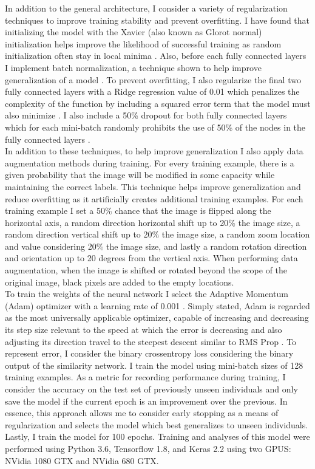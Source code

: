 \documentclass[11pt]{article}
\begin{document}
\noindent
In addition to the general architecture, I consider a variety of regularization techniques to improve training stability and prevent overfitting. I have found that initializing the model with the Xavier (also known as Glorot normal) initialization helps improve the likelihood of successful training as random initialization often stay in local minima \cite{glorot2010understanding}. Also, before each fully connected layers I implement batch normalization, a technique shown to help improve generalization of a model \cite{ioffe2015batch}. To prevent overfitting, I also regularize the final two fully connected layers with a Ridge regression value of 0.01 which penalizes the complexity of the function by including a squared error term that the model must also minimize \cite{hoerl1970ridge}. I also include a 50\% dropout for both fully connected layers which for each mini-batch randomly prohibits the use of 50\% of the nodes in the fully connected layers \cite{srivastava2014dropout}.
\newline
\\
In addition to these techniques, to help improve generalization I also apply data augmentation methods during training. For every training example, there is a given probability that the image will be modified in some capacity while maintaining the correct labels. This technique helps improve generalization and reduce overfitting as it artificially creates additional training examples. For each training example I set a 50\% chance that the image is flipped along the horizontal axis, a random direction horizontal shift up to 20\% the image size, a random direction vertical shift up to 20\% the image size, a random zoom location and value considering 20\% the image size, and lastly a random rotation direction and orientation up to 20 degrees from the vertical axis. When performing data augmentation, when the image is shifted or rotated beyond the scope of the original image, black pixels are added to the empty locations. 
\newline
\\
To train the weights of the neural network I select the Adaptive Momentum (Adam) optimizer with a learning rate of 0.001 \cite{kingma2014adam}. Simply stated, Adam is regarded as the most universally applicable optimizer, capable of increasing and decreasing its step size relevant to the speed at which the error is decreasing and also adjusting its direction travel to the steepest descent similar to RMS Prop \cite{kingma2014adam}. To represent error, I consider the binary crossentropy loss considering the binary output of the similarity network. I train the model using mini-batch sizes of 128 training examples. As a metric for recording performance during training, I consider the accuracy on the test set of previously unseen individuals and only save the model if the current epoch is an improvement over the previous. In essence, this approach allows me to consider early stopping as a means of regularization and selects the model which best generalizes to unseen individuals. Lastly, I train the model for 100 epochs. Training and analyses of this model were performed using Python 3.6, Tensorflow 1.8, and Keras 2.2 using two GPUS: NVidia 1080 GTX and NVidia 680 GTX. 
\end{document}
